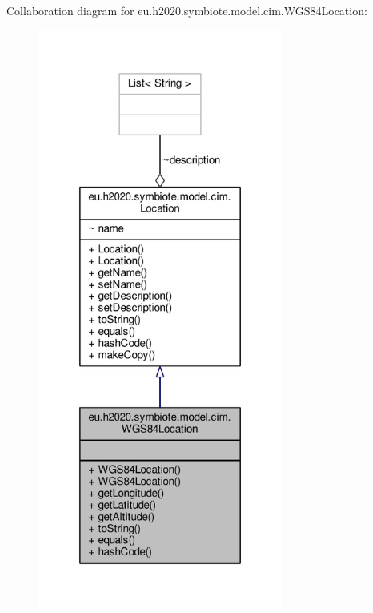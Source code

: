 Collaboration diagram for eu.\+h2020.\+symbiote.\+model.\+cim.\+W\+G\+S84\+Location\+:
\nopagebreak
\begin{figure}[H]
\begin{center}
\leavevmode
\includegraphics[width=228pt]{classeu_1_1h2020_1_1symbiote_1_1model_1_1cim_1_1WGS84Location__coll__graph}
\end{center}
\end{figure}
